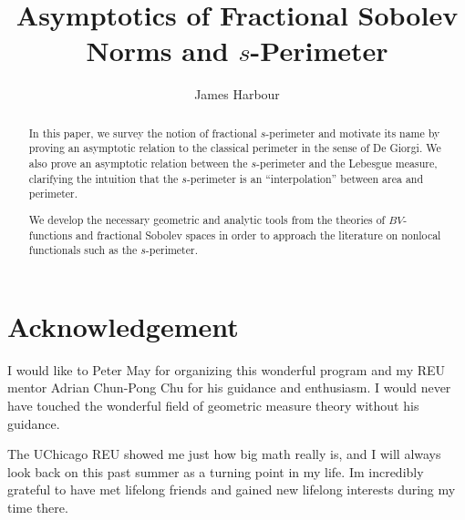 \documentclass[reqno, openany, amssymb, psamsfonts]{amsart}
\title{Asymptotics of Fractional Sobolev Norms and $s$-Perimeter}
\author{James Harbour}
\numberwithin{equation}{section}
\begin{document}
\maketitle
\begin{abstract}
  In this paper, we survey the notion of fractional $ s $-perimeter and motivate its name by proving an asymptotic relation to the classical perimeter in the sense of De Giorgi. We also prove an asymptotic relation between the $ s $-perimeter and the Lebesgue measure, clarifying the intuition that the $ s $-perimeter is an ``interpolation'' between area and perimeter.

  We develop the necessary geometric and analytic tools from the theories of $ BV $-functions and fractional Sobolev spaces in order to approach the literature on nonlocal functionals such as the $ s $-perimeter.
\end{abstract}

\tableofcontents






%














%







\section*{Acknowledgement}

I would like to Peter May for organizing this wonderful program and my REU mentor Adrian Chun-Pong Chu for his guidance and enthusiasm. I would never have touched the wonderful field of geometric measure theory without his guidance.

The UChicago REU showed me just how big math really is, and I will always look back on this past summer as a turning point in my life. Im incredibly grateful to have met lifelong friends and gained new lifelong interests during my time there.

%
%
%
%
%
%


\newpage
\printbibliography
\end{document}

